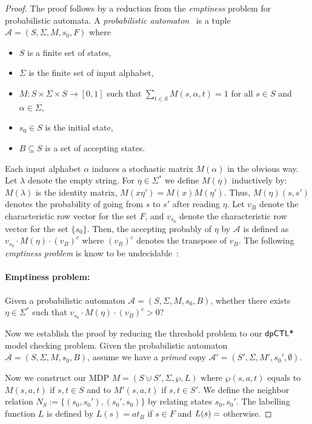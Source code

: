 \begin{proof}
The proof follows by a reduction from the \emph{emptiness} problem for probabilistic automata.
A \emph{probabilistic automaton}~\cite{Rabin63} is a tuple $\mathcal{A}= (S,\Sigma,M,s_0,F)$ where
\begin{itemize}
  \item $S$ is a finite set of states,
  \item $\Sigma$ is the finite set of input alphabet,
  \item $M: S\times\Sigma\times S \to [0,1]$ such that $\sum_{t\in S} M(s,\alpha,t)=1$ for all $s\in S$ and $\alpha\in \Sigma$,
  \item $s_0\in S$ is the initial state,
  \item $B\subseteq S$ is a set of accepting states.
\end{itemize}

Each input alphabet $\alpha$ induces a stochastic matrix $M(\alpha)$ in the obvious way. Let $\lambda$ denote the empty string. For $\eta\in\Sigma^*$ we define $M(\eta)$ inductively by: $M(\lambda)$ is the identity matrix, $M(x\eta')=M(x)M(\eta')$. Thus, $M(\eta)(s,s')$ denotes the probability of going from $s$ to $s'$ after reading $\eta$. Let $v_B$ denote the characteristic row vector for the set $F$, and $v_{s_0}$ denote the characteristic row vector for the set $\{s_0\}$. Then, the accepting probably of $\eta$ by $\mathcal{A}$ is defined as $v_{s_0}\cdot M(\eta)\cdot (v_B)^c$ where $(v_B)^c$ denotes the transpose of $v_B$. The following \emph{emptiness problem} is know to be undecidable~\cite{Paz71}:

\paragraph{Emptiness problem:} Given a probabilistic automaton $\mathcal{A}= (S,\Sigma,M,s_0,B)$, whether there exists $\eta\in\Sigma^*$ such that $v_{s_0}\cdot M(\eta)\cdot (v_B)^c > 0$?

Now we establish the proof by reducing the threshold problem to our $\textsf{dpCTL*}$ model checking problem. Given the probabilistic automaton  $\mathcal{A}= (S,\Sigma,M,s_0,B)$, assume we have a \emph{primed} copy $\mathcal{A}'= (S',\Sigma,M',s_0',\emptyset)$.

Now we construct our MDP  $M =
(S\cupdot S', \Sigma, \wp, L)$ where $\wp(s,a,t)$ equals to $M(s,a,t)$ if $s,t\in S$ and to $M'(s,a,t)$ if $s,t\in S'$. We define the neighbor relation $N_S:=\{(s_0,s_0'),(s_0',s_0)\}$ by relating states $s_0,s_0'$. The labelling function $L$ is defined by $L(s)=at_B$ if $s\in F$ and $L(s)=\empty$ otherwise.


\end{proof}
